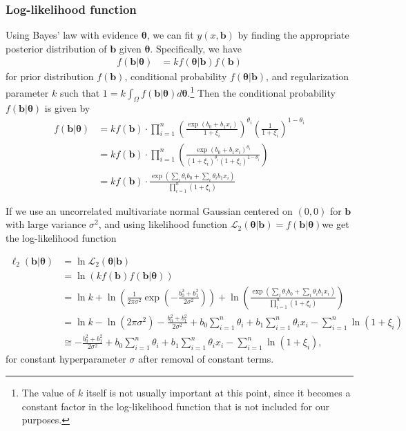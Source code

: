 \documentclass[11pt, letterpaper]{article}
\newcommand{\mc}[1]{\mathcal{#1}}
\numberwithin{equation}{section}
\begin{document}
\subsubsection{Log-likelihood function}\label{sect:l2-ll}
Using Bayes' law with evidence $\bm \theta$, we can fit $y(x, \bm b)$ by finding the appropriate posterior distribution of $\bm b$ given $\bm \theta$. Specifically, we have 
\begin{align*}
f(\bm b | \bm \theta) &= k f(\bm \theta | \bm b) f(\bm b)
\end{align*}
for prior distribution $f(\bm b)$, conditional probability $f(\bm \theta | \bm b)$, and regularization parameter $k$ such that $1 = k\int_\Omega f( \bm b | \bm \theta) d \bm \theta$.\footnote{The value of $k$ itself is not usually important at this point, since it becomes a constant factor in the log-likelihood function that is not included for our purposes.} Then the conditional probability $f(\bm b | \bm \theta)$ is given by
\begin{align*}
f(\bm b | \bm \theta) &= k f(\bm b) \cdot \prod_{i=1}^n \left( \frac{\exp(b_0+b_1x_i)}{1+\xi_i}\right)^{\theta_i}\left( \frac{1}{1+\xi_i}\right)^{1-\theta_i}\\
&= kf(\bm b) \cdot \prod_{i=1}^n \left( \frac{\exp(b_0+b_1x_i)^{\theta_i}}{\left(1+\xi_i\right)^{\theta_i}\left(1+\xi_i\right)^{1-\theta_i}}\right)\\
&=k f(\bm b) \cdot  \frac{\exp\left(\sum_i \theta_i b_0+\sum_i \theta_i b_1x_i\right)}{\prod_{i=1}^n \left( 1+\xi_i\right)}
\end{align*}

If we use an uncorrelated multivariate normal Gaussian centered on $(0,0)$ for $\bm b$ with large variance $\sigma^2$, and using likelihood function $\mc L_2(\bm \theta | \bm b) = f(\bm b | \bm \theta) $we get the log-likelihood function

\begin{align*}
\ell_2(\bm b | \bm \theta) &= \ln \mc L_2(\bm \theta | \bm b) \\
&= \ln( kf(\bm b)f(\bm b | \bm \theta)) \\
&=\ln k + \ln \left(\frac{1}{2\pi \sigma^2} \exp \left(-\frac{b_0^2 + b_1^2}{2\sigma^2} \right) \right) + \ln \left( \frac{\exp\left(\sum_i \theta_i b_0+\sum_i \theta_i b_1x_i\right)}{\prod_{i=1}^n \left( 1+\xi_i\right)} \right) \\
&= \ln k - \ln(2 \pi \sigma^2) - \frac{b_0^2 + b_1^2}{2\sigma^2} + b_0\sum_{i=1}^n \theta_i + b_1\sum_{i=1}^n \theta_ix_i - \sum_{i=1}^n \ln \left(1+\xi_i \right) \\
& \cong - \frac{b_0^2 + b_1^2}{2\sigma^2} + b_0\sum_{i=1}^n \theta_i + b_1\sum_{i=1}^n \theta_ix_i - \sum_{i=1}^n \ln \left(1+\xi_i \right),
\end{align*}
for constant hyperparameter $\sigma$ after removal of constant terms.
\end{document}
